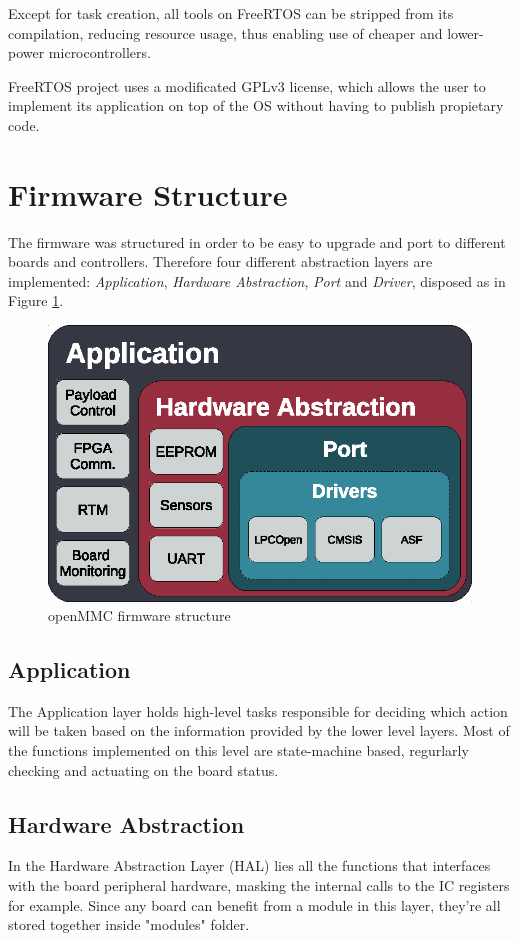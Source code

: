 \documentclass[a4paper,
              ]{jacow}
\begin{document}
Except for task creation, all tools on FreeRTOS can be stripped from its compilation, reducing resource usage, thus enabling use of cheaper and lower-power microcontrollers.

FreeRTOS project uses a modificated GPLv3 license, which allows the user to implement its application on top of the OS without having to publish propietary code.

\section{Firmware Structure}
The firmware was structured in order to be easy to upgrade and port to different boards and controllers.
Therefore four different abstraction layers are implemented: \emph{Application}, \emph{Hardware Abstraction}, \emph{Port} and \emph{Driver}, disposed as in Figure \ref{fig:fw-structure}.

\begin{figure}[!htb]
\centering
\includegraphics[scale=0.8]{fw-structure-dark.eps}
\caption{openMMC firmware structure}
\label{fig:fw-structure}
\end{figure}

\subsection{Application}
The Application layer holds high-level tasks responsible for deciding which action will be taken based on the information provided by the lower level layers. Most of the functions implemented on this level are state-machine based, regurlarly checking and actuating on the board status.

\subsection{Hardware Abstraction}
In the Hardware Abstraction Layer (HAL) lies all the functions that interfaces with the board peripheral hardware, masking the internal calls to the IC registers for example. Since any board can benefit from a module in this layer, they're all stored together inside "modules" folder.
\end{document}
